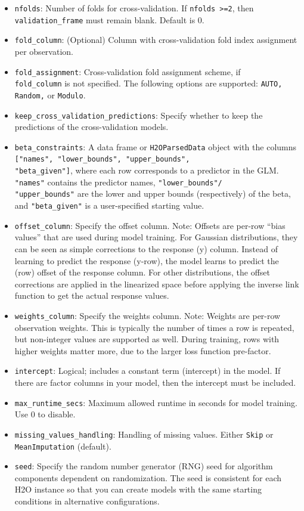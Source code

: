 \begin{itemize}
\item \texttt{nfolds}: Number of folds for cross-validation. If \texttt{nfolds >=2}, then \texttt{validation\_frame} must remain blank. Default is 0. %
\item \texttt{fold\_column}: (Optional) Column with cross-validation fold index assignment per observation. 
\item \texttt{fold\_assignment}: Cross-validation fold assignment scheme, if \\ \texttt{fold\_column} is not specified. The following options are supported: \texttt{AUTO, Random,} or \texttt{Modulo}. 
\item \texttt{keep\_cross\_validation\_predictions}: Specify whether to keep the predictions of the cross-validation models. 
\item \texttt{beta\_constraints}: A data frame or \texttt{H2OParsedData} object with the columns \texttt{["names", "lower\_bounds", "upper\_bounds", \\ "beta\_given"]}, where each row corresponds to a predictor in the GLM. \texttt{"names"} contains the predictor names, \texttt{"lower\_bounds"/ \\ "upper\_bounds"} are the lower and upper bounds (respectively) of the beta, and  \texttt{"beta\_given"} is a user-specified starting value. 
\item \texttt{offset\_column}: Specify the offset column. Note: Offsets are per-row “bias values” that are used during model training. For Gaussian distributions, they can be seen as simple corrections to the response (y) column. Instead of learning to predict the response (y-row), the model learns to predict the (row) offset of the response column. For other distributions, the offset corrections are applied in the linearized space before applying the inverse link function to get the actual response values. 
\item \texttt{weights\_column}: Specify the weights column. Note: Weights are per-row observation weights. This is typically the number of times a row is repeated, but non-integer values are supported as well. During training, rows with higher weights matter more, due to the larger loss function pre-factor.
\item \texttt{intercept}: Logical; includes a constant term (intercept) in the model. If there are factor columns in your model, then the intercept must be included. %
\item \texttt{max\_runtime\_secs}: Maximum allowed runtime in seconds for model training. Use 0 to disable.
\item {\texttt{missing\_values\_handling}}: Handling of missing values. Either {\texttt{Skip}} or {\texttt{MeanImputation}} (default).
\item \texttt{seed}: Specify the random number generator (RNG) seed for algorithm components dependent on randomization. The seed is consistent for each H2O instance so that you can create models with the same starting conditions in alternative configurations.
\end{itemize}
